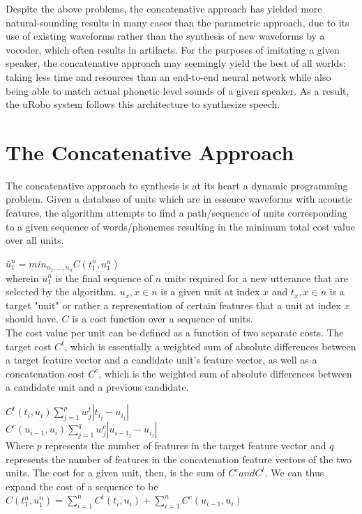 \documentclass[10pt, journal, compsoc]{IEEEtran}
\begin{document}
Despite the above problems, the concatenative approach has yielded more natural-sounding results in many cases than the parametric approach, due to its use of existing waveforms rather than the synthesis of new waveforms by a vocoder, which often results in artifacts. For the purposes of imitating a given speaker, the concatenative approach may seemingly yield the best of all worlds: taking less time and resources than an end-to-end neural network while also being able to match actual phonetic level sounds of a given speaker. As a result, the uRobo system follows this architecture to synthesize speech.  
\section{The Concatenative Approach}
The concatenative approach to synthesis is at its heart a dynamic programming problem. Given a database of units which are in essence waveforms with acoustic features, the algorithm attempts to find a path/sequence of units corresponding to a given sequence of words/phonemes resulting in the minimum total cost value over all units. \par
$\overline{u}_1^n=min_{u_1,...,u_n}C(t_1^n,u_1^n)$\\
wherein $\overline{u}_1^n$ is the final sequence of $n$ units required for a new utterance that are selected by the algorithm. $u_x, x\in n$ is a given unit at index $x$ and $t_x, x\in n$ is a target "unit" or rather a representation of certain features that a unit at index $x$ should have. $C$ is a cost function over a sequence of units.\\	
The cost value per unit can be defined as a function of two separate costs. The target cost $C^t$, which is essentially a weighted sum of absolute differences between a target feature vector and a candidate unit's feature vector, as well as a concatenation cost $C^c$, which is the weighted sum of absolute differences between a candidate unit and a previous candidate.\par
$C^t(t_i,u_i)\sum_{j=1}^pw_j^t|t_{i_j}-u_{i_j}|$\\
$C^c(u_{i-1},u_i)\sum_{j=1}^qw_j^c|u_{i-1_j}-u_{i_j}|$\\
Where $p$ represents the number of features in the target feature vector and $q$ represents the number of features in the concatenation feature vectors of the two units. The cost for a given unit, then, is the sum of $C^c and C^t$. We can thus expand the cost of a sequence to be\\
$C(t_1^n,u_1^n)=\sum_{i=1}^nC^t(t_i,u_i)+ \sum_{i=1}^nC^c(u_{i-1},u_i)$
\end{document}
